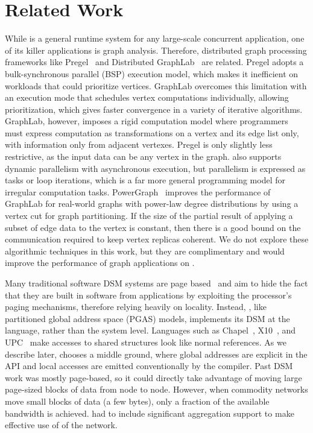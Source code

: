 \section{Related Work}

\vspace{0.5ex}
 While \Grappa is a general runtime
system for any large-scale concurrent application, one of its killer
applications is graph analysis. Therefore, distributed graph processing
frameworks like Pregel~\cite{pregel:2010} and Distributed
GraphLab~\cite{distgraphlab:vldb12} are related. Pregel adopts a
bulk-synchronous parallel (BSP) execution model, which makes it inefficient on
workloads that could prioritize vertices. GraphLab overcomes this limitation
with an execution mode that schedules vertex computations individually,
allowing prioritization, which gives faster convergence in a variety of
iterative algorithms. GraphLab, however, imposes a rigid computation model
where programmers must express computation as transformations on a vertex and
its edge list only, with information only from adjacent vertexes. Pregel is
only slightly less restrictive, as the input data can be any vertex in the
graph. \Grappa also supports dynamic parallelism with asynchronous execution,
but parallelism is expressed as tasks or loop iterations, which is a far more
general programming model for irregular computation tasks.
PowerGraph~\cite{powergraph:osdi12} improves the performance of GraphLab for
real-world graphs with power-law degree distributions by using a vertex cut
for graph partitioning. If the size of the partial result of applying a subset
of edge data to the vertex is constant, then there is a good bound on the
communication required to keep vertex replicas coherent. We do not explore
these algorithmic techniques in this work, but they are complimentary and
would improve the performance of graph applications on \Grappa.

\vspace{0.5ex}
 Many traditional software
DSM systems are page based~\cite{Treadmarks,munin} and aim to hide the fact
that they are built in software from applications by exploiting the
processor's paging mechanisms, therefore relying heavily on locality. Instead,
\Grappa, like partitioned global address space (PGAS) models, implements its
DSM at the language, rather than the system level. Languages such as
Chapel~\cite{Chamberlain:2007}, X10~\cite{X10:2005}, and UPC~\cite{upc:2005}
make accesses to shared structures look like normal references. As we describe
later, \Grappa chooses a middle ground, where global addresses are explicit in
the API and local accesses are emitted conventionally by the compiler. Past
DSM work was mostly page-based, so it could directly take advantage of moving
large page-sized blocks of data from node to node. However, when commodity
networks move small blocks of data (a few bytes), only a fraction of the
available bandwidth is achieved. \Grappa had to include significant
aggregation support to make effective use of of the network.

